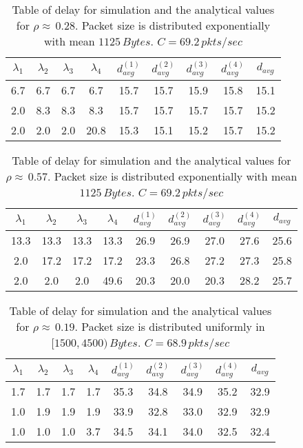 \documentclass[10pt, conference, compsocconf]{IEEEtran}
\begin{document}
\begin{table}[!h]
\caption{Table of delay for simulation and the analytical values for $\rho \approx \, 0.28$. Packet size is distributed exponentially with mean $1125 \, Bytes$. $C = 69.2\, pkts/sec$ }
\begin{center}
\begin{tabular}{|c|c|c|c|c|c|c|c|c|}
\hline $\lambda_1 $ & $\lambda_2$ & $\lambda_3$ & $\lambda_4$ & $d^{(1)}_{avg}$ & $d^{(2)}_{avg}$ & $d^{(3)}_{avg}$ & $d^{(4)}_{avg}$ & $d_{avg}$  \\ 
\hline  6.7 & 6.7 & 6.7 & 6.7 & 15.7 & 15.7 & 15.9 & 15.8 & 15.1 \\ 
\hline  2.0 & 8.3 & 8.3 & 8.3 & 15.7 & 15.7 & 15.7 & 15.7 & 15.2 \\  
\hline  2.0 & 2.0 & 2.0 & 20.8 & 15.3 & 15.1 & 15.2 & 15.7 & 15.2 \\ 
\hline 
\end{tabular} 
\end{center}
\label{table3}
\end{table}

\begin{table}[!h]
\caption{Table of delay for simulation and the analytical values for $\rho \approx \, 0.57$. Packet size is distributed exponentially with mean $1125 \, Bytes$. $C = 69.2\, pkts/sec$ }
\begin{center}
\begin{tabular}{|c|c|c|c|c|c|c|c|c|}
\hline $\lambda_1 $ & $\lambda_2$ & $\lambda_3$ & $\lambda_4$ & $d^{(1)}_{avg}$ & $d^{(2)}_{avg}$ & $d^{(3)}_{avg}$ & $d^{(4)}_{avg}$ & $d_{avg}$  \\ 
\hline  13.3 & 13.3 & 13.3 & 13.3 & 26.9 & 26.9 & 27.0 & 27.6 & 25.6 \\  
\hline  2.0 & 17.2 & 17.2 & 17.2 & 23.3 & 26.8 & 27.2 & 27.3 & 25.8 \\ 
\hline  2.0 &  2.0 & 2.0  & 49.6 & 20.3 & 20.0 & 20.3 & 28.2 & 25.7 \\ 
\hline 
\end{tabular} 
\end{center}
\label{table4}
\end{table}

\begin{table}[!h]
\caption{Table of delay for simulation and the analytical values for $\rho \approx \, 0.19$. Packet size is distributed uniformly in $[1500, 4500) \, Bytes$. $C = 68.9\, pkts/sec$ }
\begin{center}
\begin{tabular}{|c|c|c|c|c|c|c|c|c|}
\hline $\lambda_1 $ & $\lambda_2$ & $\lambda_3$ & $\lambda_4$ & $d^{(1)}_{avg}$ & $d^{(2)}_{avg}$ & $d^{(3)}_{avg}$ & $d^{(4)}_{avg}$ & $d_{avg}$  \\ 
\hline  1.7 & 1.7 & 1.7 & 1.7 & 35.3 & 34.8 & 34.9 & 35.2 & 32.9 \\ 
\hline  1.0 & 1.9 & 1.9 & 1.9 & 33.9 & 32.8 & 33.0 & 32.9 & 32.9 \\ 
\hline  1.0 & 1.0 & 1.0 & 3.7 & 34.5 & 34.1 & 34.0 & 32.5 & 32.4 \\ 
\hline 
\end{tabular} 
\end{center}
\label{table5}
\end{table}
\end{document}
